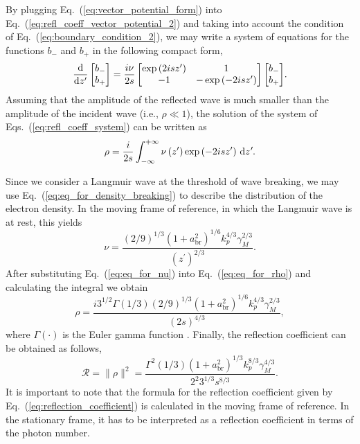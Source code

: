 \documentclass[10pt, a4paper, twoside, openright]{report}
\newcommand{\norm}[1]{\lVert#1\rVert}
\begin{document}
By plugging Eq.~(\ref{eq:vector_potential_form}) into Eq.~(\ref{eq:refl_coeff_vector_potential_2}) and taking into account the condition of Eq.~(\ref{eq:boundary_condition_2}), we may write a system of equations for the functions $ b_{-} $ and $  b_{+} $ in the following compact form,
\begin{equation}\label{eq:refl_coeff_system}
\diff*
{\begin{bmatrix}
	b_{-} \\
	b_{+} 
\end{bmatrix}}
{z^{\prime}} = \frac{i \nu}{2 s} 
\begin{bmatrix}
	\exp \left( 2 i s z^{\prime} \right) & 1 \\
	-1 & -\exp \left( -2 i s z^{\prime} \right)
\end{bmatrix}
{\begin{bmatrix}
	b_{-} \\
	b_{+}
\end{bmatrix}}.
\end{equation}
Assuming that the amplitude of the reflected wave is much smaller than the amplitude of the incident wave (i.e., $ \rho \ll 1 $), the solution of the system of Eqs.~(\ref{eq:refl_coeff_system}) can be written as
\begin{equation}\label{eq:eq_for_rho}
	\rho = \frac{i}{2 s} \int_{-\infty}^{+\infty} \nu \left( z^{\prime} \right) \exp \left( -2 i s z^{\prime} \right) \dl z^{\prime}.
\end{equation}

Since we consider a Langmuir wave at the threshold of wave breaking, we may use Eq.~(\ref{eq:eq_for_density_breaking}) to describe the distribution of the electron density. In the moving frame of reference, in which the Langmuir wave is at rest, this yields
\begin{equation}\label{eq:eq_for_nu}
\nu = \frac{\left( 2 / 9 \right)^{1/3} \left( 1 + a_{\mathrm{br}}^2 \right)^{1/6} k_p^{4/3} \gamma_M^{2/3}}{\left( z^{\prime} \right)^{2/3}}.
\end{equation} 
After substituting Eq.~(\ref{eq:eq_for_nu}) into Eq.~(\ref{eq:eq_for_rho}) and calculating the integral we obtain
\begin{equation}\label{eq:eq_for_rho_2}
\rho = \frac{i 3^{1 / 2} \Gamma \left( 1 / 3 \right) \left( 2 / 9 \right)^{1/3} \left( 1 + a_{\mathrm{br}}^2 \right)^{1/6} k_p^{4/3} \gamma_M^{2/3}}{\left( 2 s \right)^{4 / 3}},
\end{equation}
where $ \Gamma \left( \cdot \right) $ is the Euler gamma function \cite{Gradshteyn1980}. Finally, the reflection coefficient can be obtained as follows,
\begin{equation}\label{eq:reflection_coefficient}
\mathcal{R} = \norm{\rho}^2 = \frac{\Gamma^2 \left( 1 / 3 \right) \left( 1 + a_{\mathrm{br}}^2 \right)^{1 / 3} k_p^{8/3} \gamma_M^{4/3}}{2^2 3^{1 / 3} s^{8 / 3}}.
\end{equation}
It is important to note that the formula for the reflection coefficient given by Eq.~(\ref{eq:reflection_coefficient}) is calculated in the moving frame of reference. In the stationary frame, it has to be interpreted as a reflection coefficient in terms of the photon number. 
\end{document}
